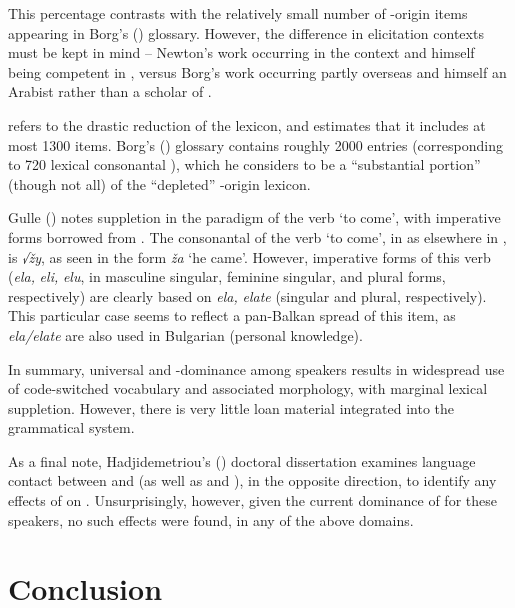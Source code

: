 \documentclass[output=paper]{langsci/langscibook}
\begin{document}
This percentage contrasts with the relatively small number of -origin items appearing in Borg's (\citeyear{Borg2004}) glossary. However, the difference in elicitation contexts must be kept in mind – Newton’s work occurring in the  context and himself being competent in , versus Borg’s work occurring partly overseas and himself an Arabist rather than a scholar of .

\citet{Roth2004} refers to the drastic reduction of the lexicon, and estimates that it includes at most 1300 items. Borg's (\citeyear{Borg2004}) glossary contains roughly 2000 entries (corresponding to 720 lexical consonantal ), which he considers to be a “substantial portion” (though not all) of the “depleted” -origin  lexicon.

Gulle (\citeyear[45]{Gulle2016}) notes suppletion in the paradigm of the verb ‘to come’, with imperative forms borrowed from . The consonantal  of the verb ‘to come’, in  as elsewhere in , is \textit{√žy}, as seen in the form \textit{ža} ‘he came’. However,  imperative forms of this verb (\textit{ela,} \textit{eli,} \textit{elu}, in masculine singular, feminine singular, and plural forms, respectively) are clearly based on  \textit{ela,} \textit{elate} (singular and plural, respectively). This particular case seems to reflect a pan-Balkan spread of this item, as \textit{ela/elate} are also used in Bulgarian (personal knowledge).

In summary, universal  and -dominance among  speakers results in widespread use of code-switched  vocabulary and associated morphology, with marginal lexical suppletion. However, there is very little loan material integrated into the  grammatical system.

As a final note, Hadjidemetriou's (\citeyear{Hadjidemetriou2009}) doctoral dissertation examines language contact between  and   (as well as  and  ), in the opposite direction, to identify any effects of  on  . Unsurprisingly, however, given the current dominance of   for these speakers, no such effects were found, in any of the above domains.

\section{Conclusion}
\end{document}
